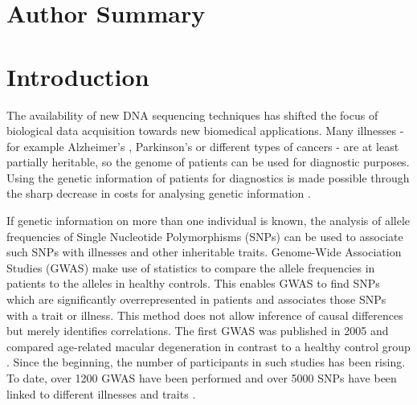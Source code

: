 \documentclass[10pt]{article}
\begin{document}
\section*{Author Summary}

\section*{Introduction}

The availability of new DNA sequencing techniques has shifted the focus of biological data acquisition towards new biomedical applications.
Many illnesses - for example Alzheimer's \cite{alzheimer}, Parkinson's \cite{parkinsons} or different types of cancers \cite{breastcancer,prostatecancer} - are at least partially heritable, so the genome of patients can be used for diagnostic purposes. Using the genetic information of patients for diagnostics is made possible through the sharp decrease in costs for analysing genetic information \cite{Brown1999}. 



If genetic information on more than one individual is known, the analysis of
allele frequencies of Single Nucleotide Polymorphisms (SNPs) can be used to associate such SNPs with illnesses and other inheritable traits. Genome-Wide Association Studies
(GWAS) make use of statistics to compare the allele frequencies in patients to the alleles in healthy controls. This
enables GWAS to find SNPs which are significantly overrepresented in patients and associates those SNPs with a trait or illness.
This method does not allow inference of causal differences but merely identifies correlations. 
The first GWAS was published in 2005 and compared age-related macular degeneration in contrast 
to a healthy control group \cite{Klein2005}. Since the beginning, the number of participants in 
such studies has been rising. To date, over 1200 GWAS have been performed \cite{Johnson2009} and over 
5000 SNPs have been linked to different illnesses and traits \cite{Hindorff2009}.   
\end{document}

